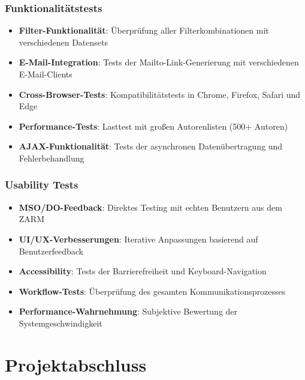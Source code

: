 \documentclass[11pt,a4paper]{article}
\begin{document}
\subsubsection{Funktionalitätstests}
\begin{itemize}
    \item \textbf{Filter-Funktionalität}: Überprüfung aller Filterkombinationen mit verschiedenen Datensets
    \item \textbf{E-Mail-Integration}: Tests der Mailto-Link-Generierung mit verschiedenen E-Mail-Clients
    \item \textbf{Cross-Browser-Tests}: Kompatibilitätstests in Chrome, Firefox, Safari und Edge
    \item \textbf{Performance-Tests}: Lasttest mit großen Autorenlisten (500+ Autoren)
    \item \textbf{AJAX-Funktionalität}: Tests der asynchronen Datenübertragung und Fehlerbehandlung
\end{itemize}

\subsubsection{Usability Tests}
\begin{itemize}
    \item \textbf{MSO/DO-Feedback}: Direktes Testing mit echten Benutzern aus dem ZARM
    \item \textbf{UI/UX-Verbesserungen}: Iterative Anpassungen basierend auf Benutzerfeedback
    \item \textbf{Accessibility}: Tests der Barrierefreiheit und Keyboard-Navigation
    \item \textbf{Workflow-Tests}: Überprüfung des gesamten Kommunikationsprozesses
    \item \textbf{Performance-Wahrnehmung}: Subjektive Bewertung der Systemgeschwindigkeit
\end{itemize}

\newpage
\section{Projektabschluss}
\end{document}

